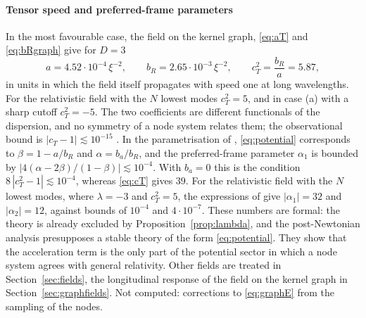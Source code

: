 \documentclass[11pt,a4paper]{article}
\theoremstyle{stmt}
\theoremstyle{defn}
\theoremstyle{rmk}
\numberwithin{equation}{section}
\begin{document}
\paragraph{Tensor speed and preferred-frame parameters} In the most favourable case, the field on the kernel graph, \eqref{eq:aT} and \eqref{eq:bRgraph} give for $D=3$
\begin{equation}\label{eq:cT}
a=4.52\cdot10^{-4}\,\xi^{-2},\qquad b_R=2.65\cdot10^{-3}\,\xi^{-2},\qquad c_T^2=\frac{b_R}{a}=5.87 ,
\end{equation}
in units in which the field itself propagates with speed one at long wavelengths. For the relativistic field with the $N$ lowest modes $c_T^2=5$, and in case (a) with a sharp cutoff $c_T^2=-5$. The two coefficients are different functionals of the dispersion, and no symmetry of a node system relates them; the observational bound is $|c_T-1|\lesssim10^{-15}$ \cite{OMW,GSS}. In the parametrisation of \cite{GSS}, \eqref{eq:potential} corresponds to $\beta=1-a/b_R$ and $\alpha=b_a/b_R$, and the preferred-frame parameter $\alpha_1$ is bounded by $|4(\alpha-2\beta)/(1-\beta)|\lesssim10^{-4}$. With $b_a=0$ this is the condition $8\,|c_T^2-1|\lesssim10^{-4}$, whereas \eqref{eq:cT} gives $39$. For the relativistic field with the $N$ lowest modes, where $\lambda=-3$ and $c_T^2=5$, the expressions of \cite{GSS} give $|\alpha_1|=32$ and $|\alpha_2|=12$, against bounds of $10^{-4}$ and $4\cdot10^{-7}$. These numbers are formal: the theory is already excluded by Proposition~\ref{prop:lambda}, and the post-Newtonian analysis presupposes a stable theory of the form \eqref{eq:potential}. They show that the acceleration term is the only part of the potential sector in which a node system agrees with general relativity. Other fields are treated in Section~\ref{sec:fields}, the longitudinal response of the field on the kernel graph in Section~\ref{sec:graphfields}. Not computed: corrections to \eqref{eq:graphE} from the sampling of the nodes.
\end{document}
